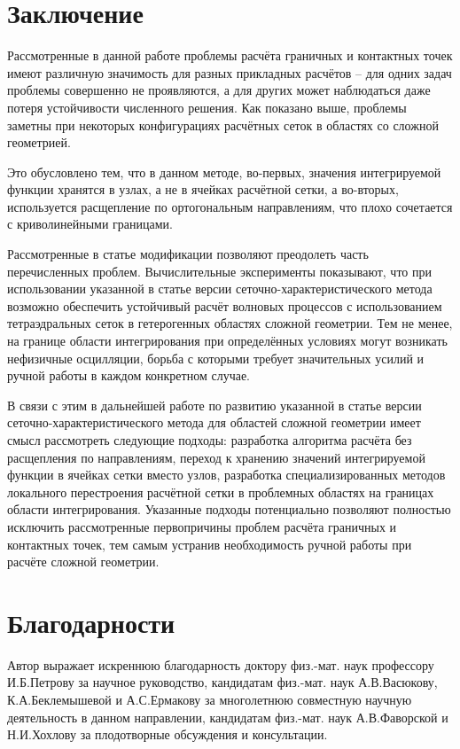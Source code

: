\documentclass[a4paper]{article}
\numberwithin{equation}{section}
\begin{document}
\section{Заключение}
Рассмотренные в данной работе проблемы расчёта граничных и контактных точек 
имеют различную значимость для разных прикладных расчётов -- 
для одних задач проблемы совершенно не проявляются, 
а для других может наблюдаться даже потеря устойчивости численного решения. 
Как показано выше, проблемы заметны при некоторых конфигурациях расчётных сеток 
в областях со сложной геометрией. 

Это обусловлено тем, что в данном методе, 
во-первых, значения интегрируемой функции хранятся в узлах, 
а не в ячейках расчётной сетки, 
а во-вторых, используется расщепление по ортогональным направлениям, что 
плохо сочетается с криволинейными границами. 

Рассмотренные в статье модификации позволяют преодолеть 
часть перечисленных проблем. Вычислительные эксперименты показывают, 
что при использовании указанной в статье версии сеточно-характеристического метода 
возможно обеспечить устойчивый расчёт волновых процессов с использованием 
тетраэдральных сеток в гетерогенных областях сложной геометрии. 
Тем не менее, на границе области интегрирования при определённых условиях 
могут возникать нефизичные осцилляции, 
борьба с которыми требует значительных усилий и 
ручной работы в каждом конкретном случае. 

В связи с этим в дальнейшей работе по развитию 
указанной в статье версии сеточно-характери\-стического метода 
для областей сложной геометрии имеет смысл рассмотреть следующие подходы: 
разработка алгоритма расчёта без расщепления по направлениям, 
переход к хранению значений интегрируемой функции в ячейках сетки вместо узлов, 
разработка специализированных методов локального перестроения 
расчётной сетки в проблемных областях на границах области интегрирования. 
Указанные подходы потенциально позволяют полностью исключить 
рассмотренные первопричины проблем расчёта граничных и контактных точек, 
тем самым устранив необходимость ручной работы при расчёте сложной геометрии.


\section{Благодарности}
Автор выражает искреннюю благодарность доктору физ.-мат. наук профессору И.Б.Петрову за научное руководство,
кандидатам физ.-мат. наук А.В.Васюкову, К.А.Беклемышевой и А.С.Ермакову за многолетнюю совместную научную деятельность в данном направлении,
кандидатам физ.-мат. наук А.В.Фаворской и Н.И.Хохлову за плодотворные обсуждения и консультации.
\end{document}
